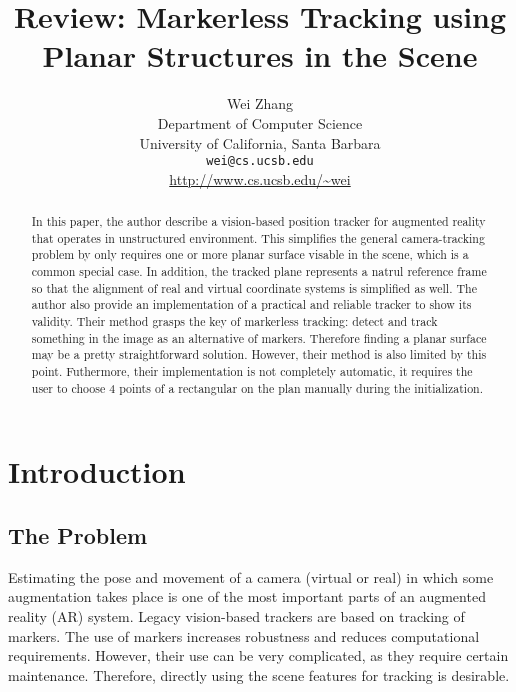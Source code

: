\documentclass[10pt,twocolumn,letterpaper]{article}
\begin{document}
\title{Review: Markerless Tracking using Planar Structures in the Scene}

\author{Wei Zhang\\
Department of Computer Science\\
University of California, Santa Barbara\\
{\tt\small wei@cs.ucsb.edu}\\
{\small\url{http://www.cs.ucsb.edu/~wei}}
}

\maketitle
\thispagestyle{empty}

\begin{abstract}
In this paper, the author describe a vision-based position tracker
 for augmented reality that operates in unstructured environment.
 This simplifies the general camera-tracking problem by only requires
 one or more planar surface visable in the scene, which is a common
 special case. In addition, the tracked plane represents a natrul
 reference frame so that the alignment of real and virtual coordinate
 systems is simplified as well. The author also provide an
 implementation of a practical and reliable tracker to show its validity.
Their method grasps the key of markerless tracking: detect and track
 something in the image as an alternative of markers. Therefore finding
 a planar surface may be a pretty straightforward solution. However,
 their method is also limited by this point. Futhermore, their implementation
 is not completely automatic, it requires the user to choose 4 points
 of a rectangular on the plan manually during the initialization.
\end{abstract}

\section{Introduction}
\subsection{The Problem}
Estimating the pose and movement of a camera (virtual or real)
in which some augmentation takes place is one of
the most important parts of an augmented reality
(AR) system. Legacy vision-based trackers are based on
tracking of markers. The use of markers increases
robustness and reduces computational requirements.
However, their use can be very complicated,
as they require certain maintenance. Therefore, directly using
 the scene features for tracking is desirable.
\end{document}

